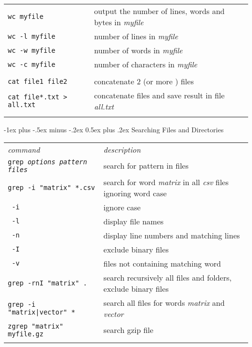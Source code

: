 \documentclass[10pt,landscape]{article}
\makeatletter
\renewcommand{\section}{\@startsection{section}{1}{0mm}%
                                {-1ex plus -.5ex minus -.2ex}%
                                {0.5ex plus .2ex}%
                                {\normalfont\large\bfseries}}
\makeatother
\begin{document}
\begin{multicols}{2}
\begin{tabular}{ll}
\texttt{wc myfile} & output the number of lines, words and bytes in \textit{myfile} \\
\texttt{wc -l myfile} & number of lines in \textit{myfile} \\
\texttt{wc -w myfile} & number of words in \textit{myfile} \\
\texttt{wc -c myfile} & number of characters in \textit{myfile} \\\\
\texttt{cat file1 file2} & concatenate 2 (or more ) files \\
\texttt{cat file*.txt > all.txt} & concatenate files and save result in file \textit{all.txt} \\

\\
\end{tabular}


\section{Searching Files and Directories}
\begin{tabular}{ll}

\emph{command} & \emph{description} \\

\texttt{grep \textit{options pattern files}} & search for pattern in files\\
\texttt{grep -i "matrix" *.csv} & search for word \textit{matrix} in all \textit{csv} files ignoring word case\\
\texttt{\hspace*{6mm} -i} & ignore case\\
\texttt{\hspace*{6mm} -l} & display file names\\
\texttt{\hspace*{6mm} -n} & display line numbers and matching lines\\
\texttt{\hspace*{6mm} -I} & exclude binary files\\
\texttt{\hspace*{6mm} -v} & files not containing matching word\\
\texttt{grep -rnI "matrix" .} & search recursively all files and folders, exclude binary files\\
\texttt{grep -i "matrix|vector" *} & search all files for words \textit{matrix} and \textit{vector} \\
\texttt{zgrep "matrix" myfile.gz} & search gzip file\\
\\


\end{tabular}
\end{multicols}
\end{document}

